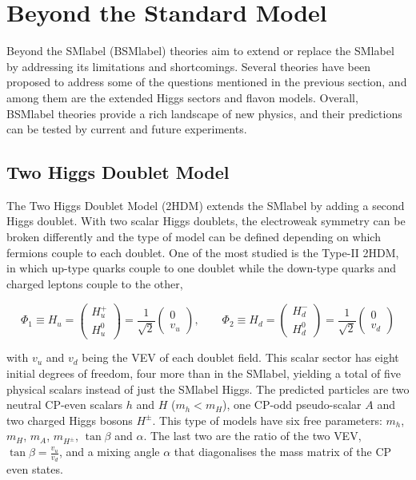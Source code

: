 \section{Beyond the Standard Model}
\label{section:BSM}

Beyond the \acrshort{SMlabel} (\acrshort{BSMlabel}) theories aim to extend or replace the \acrshort{SMlabel} by addressing its limitations and shortcomings. Several theories have been proposed to address some of the questions mentioned in the previous section, and among them are the extended Higgs sectors and flavon models. Overall, \acrshort{BSMlabel} theories provide a rich landscape of new physics, and their predictions can be tested by current and future experiments.

\subsection{Two Higgs Doublet Model}

The Two Higgs Doublet Model (2HDM) extends the \acrshort{SMlabel} by adding a second Higgs doublet. With two scalar Higgs doublets, the electroweak symmetry can be broken differently and the type of model can be defined depending on which fermions couple to each doublet. One of the most studied is the Type-II 2HDM, in which up-type quarks couple to one doublet while the down-type quarks and charged leptons couple to the other,

\begin{equation}
    \Phi_1\equiv H_u = 
    \begin{pmatrix} H^+_u \\ H^0_u \end{pmatrix} =
    \frac{1}{\sqrt{2}}
    \begin{pmatrix} 0 \\ v_u \end{pmatrix},
    \qquad
    \Phi_2\equiv H_d = 
    \begin{pmatrix} H^-_d \\ H^0_d \end{pmatrix} =
    \frac{1}{\sqrt{2}}
    \begin{pmatrix} 0 \\ v_d \end{pmatrix}
\end{equation}

with $v_u$ and $v_d$ being the \acrshort{VEV} of each doublet field. This scalar sector has eight initial degrees of freedom, four more than in the \acrshort{SMlabel}, yielding a total of five physical scalars instead of just the \acrshort{SMlabel} Higgs. The predicted particles are two neutral CP-even scalars $h$ and $H$ ($m_h < m_H$), one CP-odd pseudo-scalar $A$ and two charged Higgs bosons $H^\pm$. This type of models have six free parameters: $m_h$, $m_H$, $m_A$, $m_{H^\pm}$, $\tan\beta$ and $\alpha$. The last two are the ratio of the two \acrshort{VEV}, $\tan\beta=\frac{v_u}{v_d}$, and a mixing angle $\alpha$ that diagonalises the mass matrix of the CP even states. 

